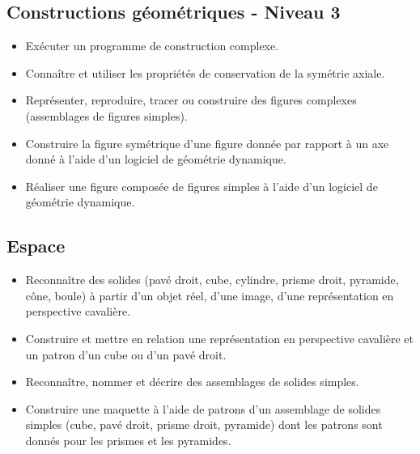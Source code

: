 \documentclass[a4paper,12pt,fleqn]{article}		
\begin{document}
\subsection*{Constructions géométriques - Niveau 3}

\begin{itemize}
	\item {}Exécuter un programme de construction complexe.
	\item {}Connaître et utiliser les propriétés de conservation de la symétrie axiale.
	\item {}Représenter, reproduire, tracer ou construire des figures complexes (assemblages de figures simples).
	\item {}Construire la figure symétrique d’une figure donnée par rapport à un axe donné à l’aide d’un logiciel de géométrie dynamique.
	\item {}Réaliser une figure composée de figures simples à l’aide d’un logiciel de géométrie dynamique.
\end{itemize}

\subsection*{Espace}

\begin{itemize}
	\item {}Reconnaître des solides (pavé droit, cube, cylindre, prisme droit, pyramide, cône, boule) à partir d’un objet réel, d’une image, d’une représentation en perspective cavalière.
	\item {}Construire et mettre en relation une représentation en perspective cavalière et un patron d’un cube ou d’un pavé droit.
	\item {}Reconnaître, nommer et décrire des assemblages de solides simples.
	\item {}Construire une maquette à l’aide de patrons d’un assemblage de solides simples (cube, pavé droit, prisme droit, pyramide) dont les patrons sont donnés pour les prismes et les pyramides.
\end{itemize}
\end{document}
